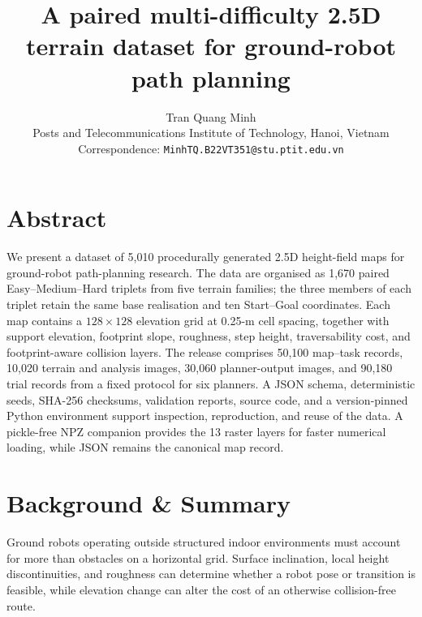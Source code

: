 \documentclass[11pt]{article}
\title{A paired multi-difficulty 2.5D terrain dataset for ground-robot path planning}
\author{%
  Tran Quang Minh\\
  \small Posts and Telecommunications Institute of Technology, Hanoi, Vietnam\\
  \small Correspondence: \texttt{MinhTQ.B22VT351@stu.ptit.edu.vn}
}
\date{}
\begin{document}
\maketitle

\section*{Abstract}

We present a dataset of 5,010 procedurally generated 2.5D height-field maps for
ground-robot path-planning research. The data are organised as 1,670 paired
Easy--Medium--Hard triplets from five terrain families; the three members of
each triplet retain the same base realisation and ten Start--Goal coordinates.
Each map contains a $128\times128$ elevation grid at 0.25-m cell spacing,
together with support elevation, footprint slope, roughness, step height,
traversability cost, and footprint-aware collision layers. The release comprises 50,100
map--task records, 10,020 terrain and analysis images, 30,060 planner-output
images, and 90,180 trial records from a fixed protocol for six planners. A JSON
schema, deterministic seeds, SHA-256 checksums, validation reports, source code,
and a version-pinned Python environment support inspection, reproduction, and
reuse of the data. A pickle-free NPZ companion provides the 13 raster layers
for faster numerical loading, while JSON remains the canonical map record.

\section{Background \& Summary}

Ground robots operating outside structured indoor environments must account
for more than obstacles on a horizontal grid. Surface inclination, local
height discontinuities, and roughness can determine whether a robot pose or
transition is feasible, while elevation change can alter the cost of an
otherwise collision-free route.
\end{document}
